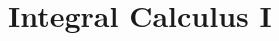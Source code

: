 \documentclass[../../main.tex]{subfiles}
\begin{document}
\chapter{Integral Calculus I}
\end{document}
